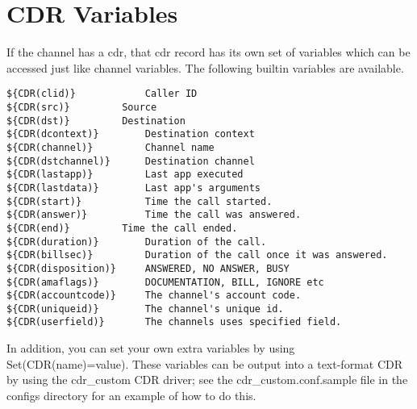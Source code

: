 \section{CDR Variables}

If the channel has a cdr, that cdr record has its own set of variables which 
can be accessed just like channel variables. The following builtin variables
are available.

\begin{verbatim}
${CDR(clid)}			Caller ID
${CDR(src)}			Source 
${CDR(dst)}			Destination
${CDR(dcontext)}		Destination context
${CDR(channel)}			Channel name
${CDR(dstchannel)}		Destination channel
${CDR(lastapp)}			Last app executed
${CDR(lastdata)}		Last app's arguments
${CDR(start)}			Time the call started.
${CDR(answer)}			Time the call was answered.
${CDR(end)}			Time the call ended.
${CDR(duration)}		Duration of the call.
${CDR(billsec)}			Duration of the call once it was answered.
${CDR(disposition)}		ANSWERED, NO ANSWER, BUSY
${CDR(amaflags)}		DOCUMENTATION, BILL, IGNORE etc
${CDR(accountcode)}		The channel's account code.
${CDR(uniqueid)}		The channel's unique id.
${CDR(userfield)}		The channels uses specified field.
\end{verbatim}

In addition, you can set your own extra variables by using Set(CDR(name)=value).
These variables can be output into a text-format CDR by using the cdr\_custom
CDR driver; see the cdr\_custom.conf.sample file in the configs directory for
an example of how to do this.
